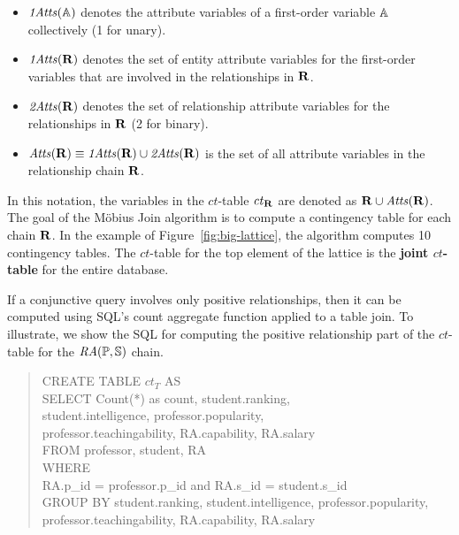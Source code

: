 \documentclass{acm_proc_article-sp}
\newcommand{\ct}{\mathit{ct}}
\begin{document}
\begin{itemize}
\item  $\it{1Atts}(\mathbb{A})$ denotes the attribute variables of a first-order variable $\mathbb{A}$ collectively (1 for unary).
\item $\it{1Atts}(\mathbf{R})$ denotes the set of entity attribute variables for the first-order variables that are involved in the relationships in $\mathbf{R}$. 
\item $\it{2Atts}(\mathbf{R})$ denotes the set of relationship attribute variables for %
the relationships in $\mathbf{R}$ (2 for binary).
\item $\it{Atts}(\mathbf{R}) \equiv \it{1Atts}(\mathbf{R}) \cup \it{2Atts}(\mathbf{R})$ is the set of all attribute variables in the relationship chain $\mathbf{R}$.
\end{itemize}


In this notation, the variables in the $\ct$-table  $\ct_{\set{\Relation}}$  are denoted as $\mathbf{R} \cup \it{Atts}({\mathbf{R}})$. 
The goal of the M\"obius Join algorithm is to compute a contingency table for each chain $\mathbf{R}$. 
In the example of Figure~\ref{fig:big-lattice}, the algorithm computes 10 contingency tables. The $\ct$-table for the top element of the lattice is the \textbf{joint $\ct$-table} for the entire database. 

If a conjunctive query involves only positive relationships, then it can be computed using SQL's count aggregate function applied to a table join. To illustrate, we show the SQL for computing the positive relationship part of the $\ct$-table for the $\mathit{RA}(\mathbb{P},\mathbb{S})$ chain.

\begin{quote}
CREATE TABLE $\ct_{T}$  AS 
\\SELECT Count(*) as  count,  student.ranking, \\student.intelligence, professor.popularity,\\ professor.teachingability, RA.capability, RA.salary  \\
FROM professor, student, RA  \\
WHERE  \\RA.p\_id = professor.p\_id and RA.s\_id = student.s\_id  \\
GROUP BY student.ranking,  student.intelligence, professor.popularity,  professor.teachingability, RA.capability,  RA.salary
\end{quote}
\end{document}

